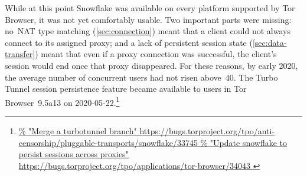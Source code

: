 \documentclass[letterpaper,twocolumn]{article}
\newlength{\urlfootnotesize}
\newcommand{\urlfootnote}[1]{\footnote{
\raggedright\fontsize{\urlfootnotesize}{\urlfootnotesize}\selectfont\url{#1}
}}
\begin{document}
While at this point Snowflake was available
on every platform supported by Tor Browser,
it was not yet comfortably usable.
Two important parts were missing:
no~NAT type matching (\autoref{sec:connection})
meant that a client could not always connect to its assigned proxy;
and a lack of persistent session state (\autoref{sec:data-transfer})
meant that even if a proxy connection was successful,
the client's session would end once that proxy disappeared.
For these reasons, by early 2020,
the average number of concurrent users
had not risen above~40.
%
%
The Turbo Tunnel session persistence feature
became available to users in Tor Browser~9.5a13
on \mbox{2020-05-22}.\urlfootnote{
https://bugs.torproject.org/tpo/anti-censorship/pluggable-transports/snowflake/33745
}
\end{document}
